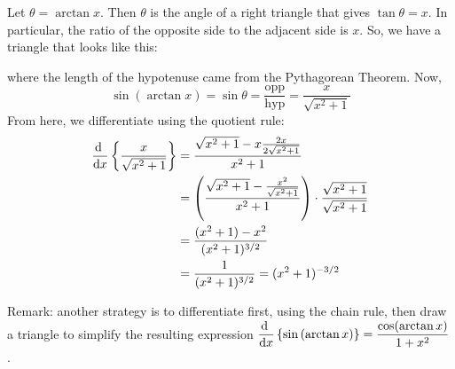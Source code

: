 \begin{solution}
Let $\theta = \arctan x$. Then $\theta$ is the angle of a right triangle that gives $\tan \theta = x$. In particular, the ratio of the opposite side to the adjacent side is $x$. So, we have a  triangle that looks like this:
\begin{center}\end{center}
where the length of the hypotenuse came from the Pythagorean Theorem. Now,
\[\sin\left(\arctan x\right) = \sin \theta = \frac{\mbox{opp}}{\mbox{hyp}} = \frac{x}{\sqrt{x^2+1}}\]
From here, we differentiate using the quotient rule:
\begin{align*}
\diff{}{x}\left\{\frac{x}{\sqrt{x^2+1}}
\right\}&=
\frac{\sqrt{x^2+1}-x\frac{2x}{2\sqrt{x^2+1}}}{x^2+1}\\
&=\left(\frac{\sqrt{x^2+1}-\frac{x^2}{\sqrt{x^2+1}}}{x^2+1}\right)\cdot\frac{\sqrt{x^2+1}}{\sqrt{x^2+1}}\\
&=\frac{(x^2+1)-x^2}{(x^2+1)^{3/2}}\\
&=\frac{1}{(x^2+1)^{3/2}}=(x^2+1)^{-3/2}
\end{align*}

Remark: another strategy is to differentiate first, using the chain rule, then draw a triangle to simplify the resulting expression
$\ds\diff{}{x}\left\{\sin\left(\arctan x\right)\right\}=\dfrac{\cos(\arctan x)}{1+x^2}$.
\end{solution}


